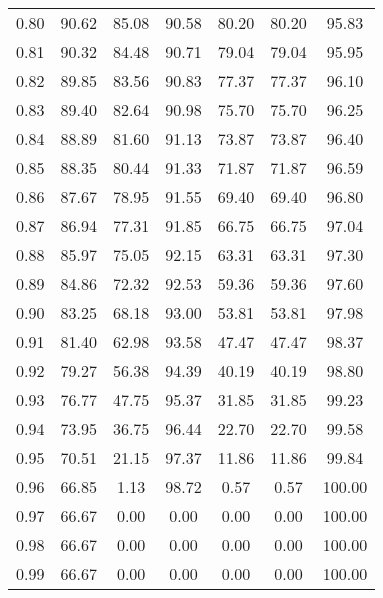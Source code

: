 \begin{tabular}{|c|c|c|c|c|c|c|}
      0.80 &     90.62 &     85.08 &      90.58 &   80.20 &      80.20 &         95.83 \\
      0.81 &     90.32 &     84.48 &      90.71 &   79.04 &      79.04 &         95.95 \\
      0.82 &     89.85 &     83.56 &      90.83 &   77.37 &      77.37 &         96.10 \\
      0.83 &     89.40 &     82.64 &      90.98 &   75.70 &      75.70 &         96.25 \\
      0.84 &     88.89 &     81.60 &      91.13 &   73.87 &      73.87 &         96.40 \\
      0.85 &     88.35 &     80.44 &      91.33 &   71.87 &      71.87 &         96.59 \\
      0.86 &     87.67 &     78.95 &      91.55 &   69.40 &      69.40 &         96.80 \\
      0.87 &     86.94 &     77.31 &      91.85 &   66.75 &      66.75 &         97.04 \\
      0.88 &     85.97 &     75.05 &      92.15 &   63.31 &      63.31 &         97.30 \\
      0.89 &     84.86 &     72.32 &      92.53 &   59.36 &      59.36 &         97.60 \\
      0.90 &     83.25 &     68.18 &      93.00 &   53.81 &      53.81 &         97.98 \\
      0.91 &     81.40 &     62.98 &      93.58 &   47.47 &      47.47 &         98.37 \\
      0.92 &     79.27 &     56.38 &      94.39 &   40.19 &      40.19 &         98.80 \\
      0.93 &     76.77 &     47.75 &      95.37 &   31.85 &      31.85 &         99.23 \\
      0.94 &     73.95 &     36.75 &      96.44 &   22.70 &      22.70 &         99.58 \\
      0.95 &     70.51 &     21.15 &      97.37 &   11.86 &      11.86 &         99.84 \\
      0.96 &     66.85 &      1.13 &      98.72 &    0.57 &       0.57 &        100.00 \\
      0.97 &     66.67 &      0.00 &       0.00 &    0.00 &       0.00 &        100.00 \\
      0.98 &     66.67 &      0.00 &       0.00 &    0.00 &       0.00 &        100.00 \\
      0.99 &     66.67 &      0.00 &       0.00 &    0.00 &       0.00 &        100.00 \\
\bottomrule
\end{tabular}
